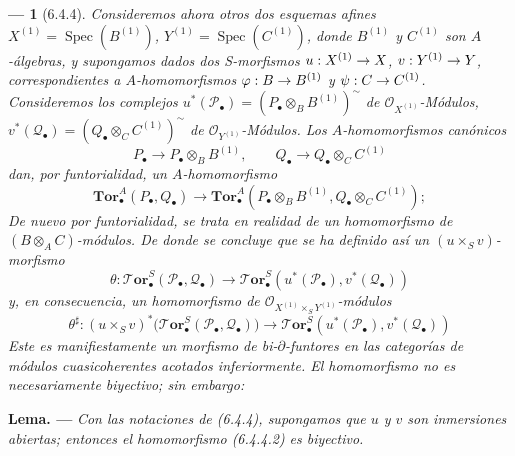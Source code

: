 \documentclass[10pt,oneside,openany]{book}
\makeatletter
\theoremstyle{egaenv}\newtheorem*{env}{---}
\theoremstyle{egastatement}
\theoremstyle{egadescription}
\newenvironment{namedtheorem}[2][]{\par\medskip\noindent\setmanualcurrentlabel{#1}\textbf{#2\ifstrempty{#1}{}{ (#1)}. ---}\ifstrequal{#2}{Observación}{\normalfont}{\ifstrequal{#2}{Observaciones}{\normalfont}{\itshape}}}{\par\medskip}
\newcommand{\oldpage}[2][]{\marginnote{\normalfont\scriptsize\textbf{#1}\,|\,#2}\ignorespaces}
\newcommand{\setmanualcurrentlabel}[1]{\def\@currentlabel{#1}}
\renewcommand{\to}{\mathchoice{\longrightarrow}{\rightarrow}{\rightarrow}{\rightarrow}}
\makeatother
\begin{document}
\begin{env}[6.4.4]
Consideremos ahora otros dos esquemas afines
$X^{(1)}=\operatorname{Spec}(B^{(1)})$,
$Y^{(1)}=\operatorname{Spec}(C^{(1)})$, donde $B^{(1)}$ y $C^{(1)}$ son
$A$-álgebras, y supongamos dados dos
\oldpage[III]{147}
S-morfismos $u:X^{(1)}\to X$, $v:Y^{(1)}\to Y$, correspondientes a
$A$-homomorfismos
$\varphi:B\to B^{(1)}$ y
$\psi:C\to C^{(1)}$.
Consideremos los complejos
$u^*(\mathscr P_\bullet)=(P_\bullet\otimes_B B^{(1)})^{\sim}$ de
$\mathscr O_{X^{(1)}}$-Módulos,
$v^*(\mathscr Q_\bullet)=(Q_\bullet\otimes_C C^{(1)})^{\sim}$ de
$\mathscr O_{Y^{(1)}}$-Módulos. Los $A$-homomorfismos canónicos
\[
  P_\bullet\longrightarrow P_\bullet\otimes_B B^{(1)},
  \qquad
  Q_\bullet\longrightarrow Q_\bullet\otimes_C C^{(1)}
\]
dan, por funtorialidad, un $A$-homomorfismo
\[
  \mathbf{Tor}_\bullet^A(P_\bullet,Q_\bullet)
  \longrightarrow
  \mathbf{Tor}_\bullet^A
  (P_\bullet\otimes_B B^{(1)},Q_\bullet\otimes_C C^{(1)});
\]
De nuevo por funtorialidad, se trata en realidad de un homomorfismo
de $(B\otimes_A C)$-módulos. De donde se concluye que se ha definido así un $(u\times_S v)$-morfismo
\[
  \theta:\boldsymbol{\mathscr{T}\!or}_\bullet^S(\mathscr P_\bullet,\mathscr Q_\bullet)
  \longrightarrow
  \boldsymbol{\mathscr{T}\!or}_\bullet^S
  (u^*(\mathscr P_\bullet),v^*(\mathscr Q_\bullet))
  \tag{6.4.4.1}\label{III.6.4.4.1.fr}
\]
y, en consecuencia, un homomorfismo de
$\mathscr O_{X^{(1)}\times_S Y^{(1)}}$-módulos
\[
  \theta^\sharp:(u\times_S v)^*
  \bigl(\boldsymbol{\mathscr{T}\!or}_\bullet^S(\mathscr P_\bullet,\mathscr Q_\bullet)\bigr)
  \longrightarrow
  \boldsymbol{\mathscr{T}\!or}_\bullet^S
  (u^*(\mathscr P_\bullet),v^*(\mathscr Q_\bullet))
  \tag{6.4.4.2}\label{III.6.4.4.2.fr}
\]
Este es manifiestamente un morfismo de \emph{bi-$\partial$-funtores} en
las categorías de módulos cuasicoherentes acotados inferiormente.
El homomorfismo  no es necesariamente biyectivo;
sin embargo:
\end{env}

\begin{namedtheorem}[6.4.5]{Lema}
Con las notaciones de \textup{(6.4.4)}, supongamos que $u$ y $v$ son inmersiones
abiertas; entonces el homomorfismo \textup{(6.4.4.2)} es biyectivo.
\end{namedtheorem}
\end{document}
